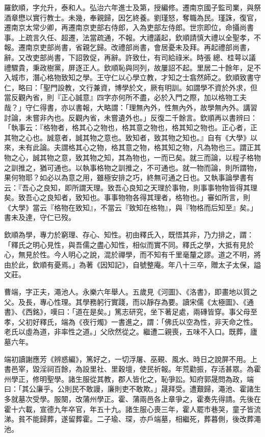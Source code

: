 \begin{pinyinscope}
羅欽順，字允升，泰和人。弘治六年進士及第，授編修。遷南京國子監司業，與祭酒章懋以實行教士。未幾，奉親歸，因乞終養。劉瑾怒，奪職為民。瑾誅，復官，遷南京太常少卿，再遷南京吏部右侍郎，入為吏部左侍郎。世宗即位，命攝尚書事。上疏言久任、超遷，法當疏通，不報。大禮議起，欽順請慎大禮以全聖孝，不報。遷南京吏部尚書，省親乞歸。改禮部尚書，會居憂未及拜。再起禮部尚書，辭。又改吏部尚書，下詔敦促，再辭。許致仕，有司給祿米。時張總、桂萼以議禮驟貴，秉政樹黨，屏逐正人。欽順恥與同列，故屢詔不起。里居二十餘年，足不入城市，潛心格物致知之學。王守仁以心學立教，才知之士翕然師之。欽順致書守仁，略曰：「聖門設教，文行兼資，博學於文，厥有明訓。如謂學不資於外求，但當反觀內省，則『正心誠意』四字亦何所不盡，必於入門之際，加以格物工夫哉？」守仁得書，亦以書報，大略謂：「理無內外，性無內外，故學無內外。講習討論，未嘗非內也。反觀內省，未嘗遺外也。」反復二千餘言。欽順再以書辨曰：「執事云：『格物者，格其心之物也，格其意之物也，格其知之物也。正心者，正其物之心也。誠意者，誠其物之意也。致知者，致其物之知也。』自有《大學》以來，未有此論。夫謂格其心之物，格其意之物，格其知之物，凡為物也三。謂正其物之心，誠其物之意，致其物之知，其為物也，一而已矣。就三而論，以程子格物之訓推之，猶可通也。以執事格物之訓推之，不可通也。就一物而論，則所謂物，果何物耶？如必以為意之用，雖極安排之巧，終無可通之日也。又執事論學書有云：『吾心之良知，即所謂天理。致吾心良知之天理於事物，則事事物物皆得其理矣。致吾心之良知者，致知也。事事物物各得其理者，格物也。」審如所言，則《大學》當云『格物在致知』，不當云『致知在格物』，與『物格而后知至』矣。」書未及達，守仁已歿。

欽順為學，專力於窮理、存心、知性。初由釋氏入，既悟其非，乃力排之，謂：「釋氏之明心見性，與吾儒之盡心知性，相似而實不同。釋氏之學，大抵有見於心，無見於性。今人明心之說，混於禪學，而不知有千里毫釐之謬。道之不明，將由於此，欽順有憂焉。」為著《因知記》，自號整庵。年八十三卒，贈太子太保，謚文莊。

曹端，字正夫，澠池人。永樂六年舉人。五歲見《河圖》、《洛書》，即畫地以質之父。及長，專心性理。其學務躬行實踐，而以靜存為要。讀宋儒《太極圖》、《通書》、《西銘》，嘆曰：「道在是矣。」篤志研究，坐下著足處，兩磚皆穿。事父母至孝，父初好釋氏，端為《夜行燭》一書進之，謂：「佛氏以空為性，非天命之性。老氏以虛為道，非率性之道。」父欣然從之。繼遭二親喪，五味不入口。既葬，廬墓六年。

端初讀謝應芳《辨惑編》，篤好之，一切浮屠、巫覡、風水、時日之說屏不用。上書邑宰，毀淫祠百餘，為設里社、里穀壇，使民祈報。年荒勸振，存活甚眾。為霍州學正，修明聖學。諸生服從其教，郡人皆化之，恥爭訟。知府郭晟問為政，端曰：「其公廉乎。公則民不敢謾，廉則吏不敢欺。」晟拜受。遭艱歸，澠池、霍諸生多就墓次受學。服闋，改蒲州學正。霍、蒲兩邑各上章爭之，霍奏先得請。先後在霍十六載，宣德九年卒官，年五十九。諸生服心喪三年，霍人罷市巷哭，童子皆流涕。貧不能歸葬，遂留葬霍。二子瑜、琛，亦戶端墓，相繼死，葬暮側，後改葬澠池。


\end{pinyinscope}

